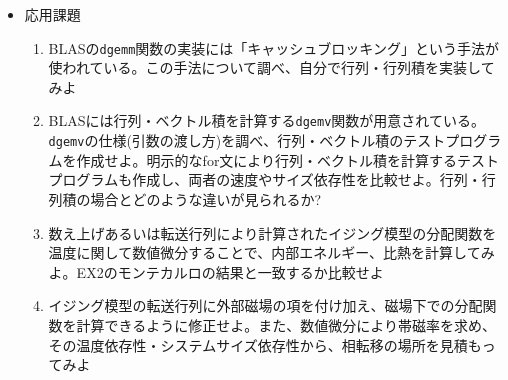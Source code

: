 \documentclass[11pt]{jarticle}
\begin{document}
\begin{itemize}
\begin{enumerate}
    {\tt example-2-EX3/transfer\_matrix.c}では、最初に転送行列${\bf T}$を作り、行列・行列積により${\bf T}^L$を計算しているが、行列を陽に生成せずに$2^M$個の基底ベクトルにそれぞれ${\bf T}$を$L$回掛けて、それぞれの対応する成分を足し合わせる方法で転送行列を計算するようにプログラムを変更せよ。システムサイズを増やしていった時の計算時間やメモリ使用量の増加はどのように改善されるか? (参考: 講義資料 {\tt lecture-2-3.pdf} p.13) なお、実行中のメモリ使用量は{\tt top}コマンドでモニタすることができる
  \item {\tt example-2-EX3/transfer\_matrix.c}内の関数{\tt product\_T}とべき乗法を用いて、転送行列${\bf T}$の最大固有値を求め、長さ$L$が無限の系の自由エネルギー密度を計算せよ(参考: 講義資料 {\tt lecture-1-4.pdf} p.4)。なお、温度$T=2$、幅$M=4$の時の自由エネルギー密度の厳密な値は、-2.0757223592$\cdots$である
  \end{enumerate}
\item 応用課題
  \begin{enumerate}
  \item BLASの{\tt dgemm}関数の実装には「キャッシュブロッキング」という手法が使われている。この手法について調べ、自分で行列・行列積を実装してみよ
  \item BLASには行列・ベクトル積を計算する{\tt dgemv}関数が用意されている。{\tt dgemv}の仕様(引数の渡し方)を調べ、行列・ベクトル積のテストプログラムを作成せよ。明示的なfor文により行列・ベクトル積を計算するテストプログラムも作成し、両者の速度やサイズ依存性を比較せよ。行列・行列積の場合とどのような違いが見られるか?
  \item 数え上げあるいは転送行列により計算されたイジング模型の分配関数を温度に関して数値微分することで、内部エネルギー、比熱を計算してみよ。EX2のモンテカルロの結果と一致するか比較せよ
  \item イジング模型の転送行列に外部磁場の項を付け加え、磁場下での分配関数を計算できるように修正せよ。また、数値微分により帯磁率を求め、その温度依存性・システムサイズ依存性から、相転移の場所を見積もってみよ
  \end{enumerate}
\end{itemize}
\end{document}
